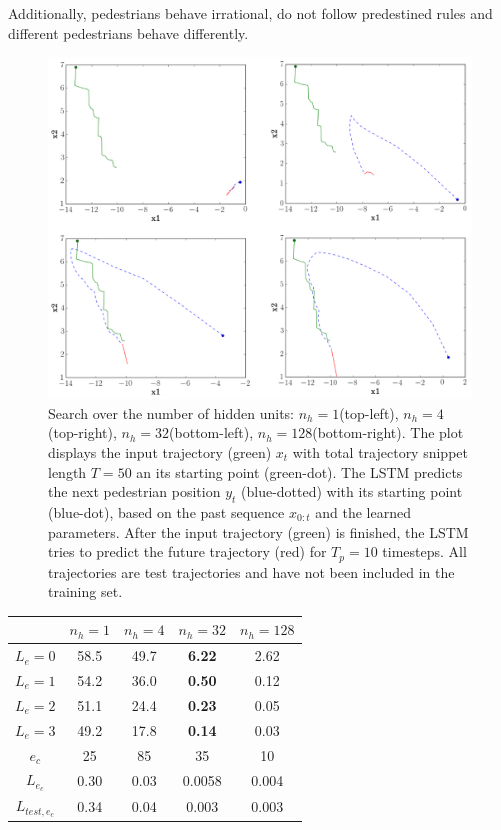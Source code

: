 Additionally, pedestrians behave irrational, do not follow predestined rules and different pedestrians behave differently. 

\begin{figure}
	\centering
	\includegraphics [trim=0 0 0 0, clip, angle=0, width=1.0\columnwidth,
	keepaspectratio]{figures/rnn_real_ped}
	\caption{Search over the number of hidden units: $n_h=1$(top-left), $n_h=4$(top-right), $n_h=32$(bottom-left), $n_h=128$(bottom-right). The plot displays the input trajectory (green) $x_t$ with total trajectory snippet length $T=50$ an its starting point (green-dot). The LSTM predicts the next pedestrian position $y_t$ (blue-dotted) with its starting point (blue-dot), based on the past sequence $x_{0:t}$ and the learned parameters. After the input trajectory (green) is finished, the LSTM tries to predict the future trajectory (red) for $T_p=10$ timesteps. All trajectories are test trajectories and have not been included in the training set.}
	\label{fig:rnn_real_ped}
\end{figure}

\begin{table}[]
\centering
\begin{tabular}{ c| c| c| c| c}
& $n_h=1$ & $n_h=4$ &$n_h=32$ & $n_h=128$\\
\hline
$L_e=0$ & 58.5 & 49.7  & \textbf{6.22} & 2.62      \\
$L_e=1$ & 54.2 & 36.0  & \textbf{0.50} & 0.12      \\
$L_e=2$ & 51.1 & 24.4  & \textbf{0.23} & 0.05      \\
$L_e=3$ & 49.2 & 17.8  & \textbf{0.14} & 0.03      \\
\hline
$e_c$ 			& 25 	& 85 	& 35	& 10 		\\
$L_{e_c}$		&  0.30	& 0.03	& 0.0058& 0.004 	\\
$L_{test, e_c}$	& 0.34	& 0.04	&0.003	& 0.003 	\\     
\end{tabular}
\end{table}

